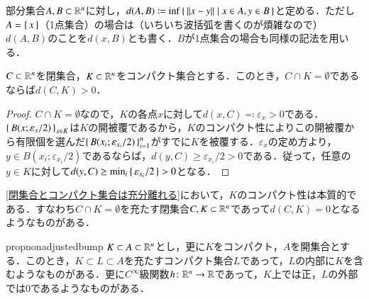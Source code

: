 \begin{defi}
部分集合$A,B \subset \mathbb{R}^n$に対し，$d(A,B) \coloneqq \inf\set{\|x-y\||x \in A, y \in B}$と定める．ただし$A = \set{x}$（1点集合）の場合は（いちいち波括弧を書くのが煩雑なので）$d(A,B)$のことを$d(x,B)$とも書く．$B$が1点集合の場合も同様の記法を用いる．
\end{defi}

\begin{prop}\label{閉集合とコンパクト集合は充分離れる}
$C \subset \mathbb{R}^n$を閉集合，$K \subset \mathbb{R}^n$をコンパクト集合とする．このとき，$C \cap K = \emptyset$であるならば$d(C,K) > 0$．
\end{prop}

\begin{proof}
$C \cap K = \emptyset$なので，$K$の各点$x$に対して$d(x,C) \eqqcolon \varepsilon_x > 0$である．$\set{B(x;\varepsilon_x/2)}_{x \in K}$は$K$の開被覆であるから，$K$のコンパクト性によりこの開被覆から有限個を選んだ$\set{B(x_i;\varepsilon_{x_i} /2)}_{i=1}^n$がすでに$K$を被覆する．$\varepsilon_x$の定め方より，$y \in B(x_i; \varepsilon_{x_i}/2)$であるならば，$d(y,C) \geq \varepsilon_{x_i}/2 > 0$である．従って，任意の$y \in K$に対して$d(y,C) \geq \min_i \set{\varepsilon_{x_i}/2} >0$となる．
\end{proof}

\begin{que}
\cref{閉集合とコンパクト集合は充分離れる}において，$K$のコンパクト性は本質的である．すなわち$C \cap K = \emptyset$を充たす閉集合$C,K \subset \mathbb{R}^n$であって$d(C,K)=0$となるようなものがある．
\end{que}

\begin{restatable}{prop}{nonadjustedbump}\label{未調整な隆起関数}
$K \subset A \subset \mathbb{R}^n$とし，更に$K$をコンパクト，$A$を開集合とする．このとき，$K \subset L \subset A$を充たすコンパクト集合$L$であって，$L$の内部に$K$を含むようなものがある．更に$C^\infty$級関数$h \colon \mathbb{R}^n \to \mathbb{R}$であって，$K$上では正，$L$の外部では0であるようなものがある．
\end{restatable}

